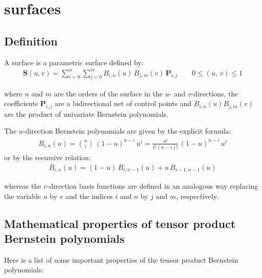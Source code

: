 \section{\Bezier surfaces}

\subsection{Definition}

A \Bezier surface is a parametric surface defined by:
\begin{align}
\label{eq:def_bspline_surface}
\mathbf{S}(u,v)=\sum_{i=0}^{n} \sum_{j=0}^{m} B_{i,n}(u)\,  B_{j,m}(v)\, \mathbf{P}_{i,j} \quad \quad 0 \leq (u, \, v) \leq 1
\end{align}

where $n$ and $m$ are the orders of the surface in the $u$- and $v$-directions, the coefficients $\mathbf{P}_{i, j}$ are a bidirectional net of control points and $B_{i,n}(u)B_{j,m}(v)$ are the product of univariate Bernstein polynomials.

The $u$-direction Bernstein polynomials are given by the explicit formula:
\begin{align}
    \label{eq:def_bernstein_explicit}
    B_{i,n}(u) = \binom{n}{i}  \, (1-u)^{n-i} \, u^{i} = \frac{n!}{i! \, (n-i)!} \, (1-u)^{n-i} \, u^{i}  
\end{align}
or by the recursive relation:
\begin{align}
    \label{eq:def_bernstein_recursive}
    B_{i,n}(u) = (1-u) \, B_{i,n-1}(u) + u \, B_{i-1,n-1}(u)
\end{align}

whereas the $v$-direction basis functions are defined in an analogous way replacing the variable $u$ by $v$ and the indices $i$ and $n$ by $j$ and $m$, respectively.



\subsection{Mathematical properties of tensor product Bernstein polynomials}
Here is a list of some important properties of the tensor product Bernstein polynomials:


